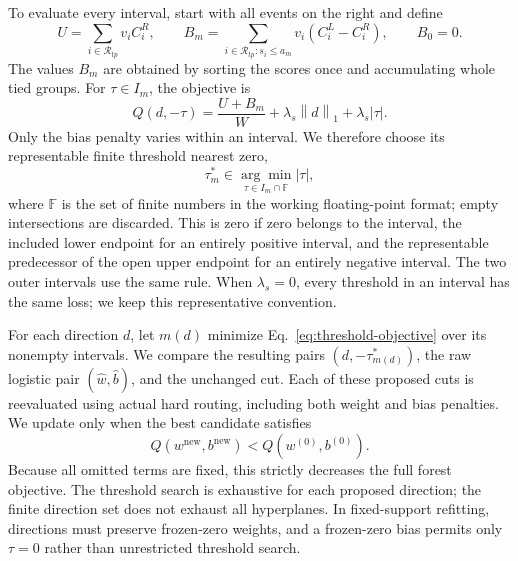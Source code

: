 \documentclass[11pt,a4paper]{article}
\newcommand{\normone}[1]{\left\lVert #1\right\rVert_1}
\begin{document}
To evaluate every interval, start with all events on the right and define
\begin{equation}
 U=\sum_{i\in\mathcal R_{tp}}v_i C_i^R,\qquad
 B_m=\sum_{i\in\mathcal R_{tp}:s_i\leq a_m}v_i(C_i^L-C_i^R),
 \qquad B_0=0.
 \label{eq:threshold-prefix}
\end{equation}
The values $B_m$ are obtained by sorting the scores once and accumulating
whole tied groups. For $\tau\in I_m$, the objective is
\begin{equation}
 Q(d,-\tau)=\frac{U+B_m}{W}+\lambda_s\normone{d}+\lambda_s|\tau|.
 \label{eq:threshold-objective}
\end{equation}
Only the bias penalty varies within an interval. We therefore choose its
representable finite threshold nearest zero,
\begin{equation}
 \tau_m^*\in\underset{\tau\in I_m\cap\mathbb F}{\arg\min}|\tau|,
 \label{eq:threshold-representative}
\end{equation}
where $\mathbb F$ is the set of finite numbers in the working floating-point
format; empty intersections are discarded. This is zero if zero belongs
to the interval, the included lower endpoint for an entirely positive
interval, and the representable predecessor of the open upper endpoint for
an entirely negative interval. The two outer intervals use the same rule.
When $\lambda_s=0$, every threshold in an interval has the same loss; we
keep this representative convention.

For each direction $d$, let $m(d)$ minimize
Eq.~\eqref{eq:threshold-objective} over its nonempty intervals. We compare the
resulting pairs $(d,-\tau_{m(d)}^*)$, the raw logistic pair
$(\widehat w,\widehat b)$, and the unchanged cut. Each of these proposed cuts
is reevaluated using actual hard routing, including both weight and bias
penalties. We update
only when the best candidate satisfies
\begin{equation}
 Q(w^{\mathrm{new}},b^{\mathrm{new}})<Q(w^{(0)},b^{(0)}).
 \label{eq:cut-acceptance}
\end{equation}
Because all omitted terms are fixed, this strictly decreases the full forest
objective. The threshold search is exhaustive for each proposed direction;
the finite direction set does not exhaust all hyperplanes. In fixed-support
refitting, directions must preserve frozen-zero weights, and a frozen-zero
bias permits only $\tau=0$ rather than unrestricted threshold search.
\end{document}
